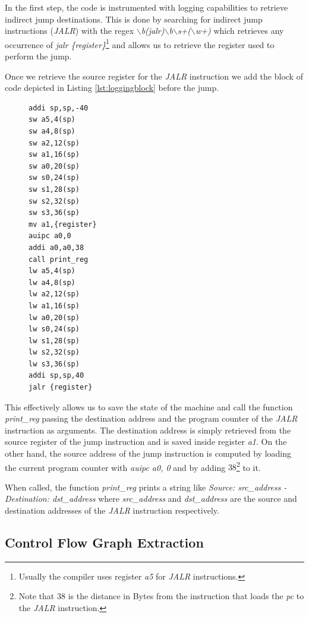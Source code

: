 In the first step, the code is instrumented with logging capabilities to
retrieve indirect jump destinations. This is done by searching for indirect jump
instructions (\textit{JALR}) with the regex \textit{$\backslash$b(jalr)$\backslash$b$\backslash$s+($\backslash$w+)}
which retrieves any occurrence of \textit{jalr \{register\}}\footnote{Usually
the compiler uses register \textit{a5} for \textit{JALR} instructions.} and allows
us to retrieve the register used to perform the jump.

Once we retrieve the source register for the \textit{JALR} instruction we add
the block of code depicted in Listing \ref{lst:loggingblock} before the jump.

\begin{figure}
  \setlength{\intextsep}{0pt}
  \begin{minipage}{0.25\textwidth}
    \begin{lstlisting}[style=Assembly, caption = Logging code block, label={lst:loggingblock}]
addi sp,sp,-40
sw a5,4(sp)
sw a4,8(sp)
sw a2,12(sp)
sw a1,16(sp)
sw a0,20(sp)
sw s0,24(sp)
sw s1,28(sp)
sw s2,32(sp)
sw s3,36(sp)
mv a1,{register}
auipc a0,0
addi a0,a0,38
call print_reg
lw a5,4(sp)
lw a4,8(sp)
lw a2,12(sp)
lw a1,16(sp)
lw a0,20(sp)
lw s0,24(sp)
lw s1,28(sp)
lw s2,32(sp)
lw s3,36(sp)
addi sp,sp,40
jalr {register}
 \end{lstlisting}
  \end{minipage}
\end{figure}

This effectively allows us to save the state of the machine and call the function
\textit{print\_reg} passing the destination address and the program counter of
the \textit{JALR} instruction as arguments. The destination address is simply
retrieved from the source register of the jump instruction and is saved inside
register \textit{a1}. On the other hand, the source address of the jump instruction
is computed by loading the current program counter with \textit{auipc a0, 0} and
by adding $38$\footnote{Note that $38$ is the distance in Bytes from the
instruction that loads the \textit{pc} to the \textit{JALR} instruction.} to it.

When called, the function \textit{print\_reg} prints a string like \textit{Source:
src\_address - Destination: dst\_address} where \textit{src\_address} and \textit{dst\_address}
are the source and destination addresses of the \textit{JALR} instruction respectively.

\subsection{Control Flow Graph Extraction}
\label{subsec:project_cfgextraction}

